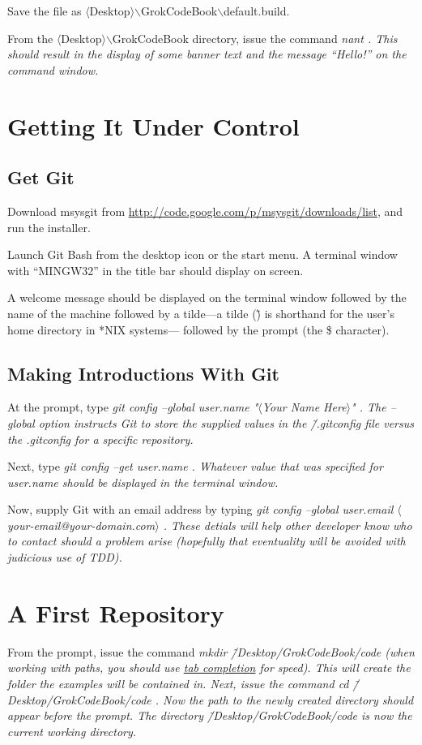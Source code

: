 Save the file as $\langle$Desktop$\rangle$$\backslash$GrokCodeBook$\backslash$default.build.

From the $\langle$Desktop$\rangle$$\backslash$GrokCodeBook directory, issue the command \em nant \em. This should result in the display of some banner text and the message ``Hello!'' on the command window.

\section{Getting It Under Control}
\subsection{Get Git}
Download msysgit from \url{http://code.google.com/p/msysgit/downloads/list}, and run the installer.

Launch Git Bash from the desktop icon or the start menu. A terminal window with ``MINGW32'' in the title bar should display on screen.

A welcome message should be displayed on the terminal window followed by the name of the machine followed by a tilde---a tilde (\~) is shorthand for the user's home directory in *NIX systems--- followed by the prompt (the \$ character).

\subsection{Making Introductions With Git}
At the prompt, type \em git config --global user.name "$\langle$Your Name Here$\rangle$" \em. The \em --global \em option instructs Git to store the supplied values in the \em \~/.gitconfig \em file versus the \em .gitconfig \em for a specific repository.

Next, type \em git config --get user.name \em. Whatever value that was specified for \em user.name \em should be displayed in the terminal window.

Now, supply Git with an email address by typing \em git config --global user.email $\langle$your-email@your-domain.com$\rangle$ \em. These detials will help other developer know who to contact should a problem arise (hopefully that eventuality will be avoided with judicious use of \gls{TDD}).

\section{A First Repository}
From the prompt, issue the command \em mkdir \~/Desktop/GrokCodeBook/code \em (when working with paths, you should use \hyperref[tab-completion]{tab completion} for speed). This will create the folder the examples will be contained in. Next, issue the command \em cd \~/Desktop/GrokCodeBook/code \em. Now the path to the newly created directory should appear before the prompt. The directory \em \~/Desktop/GrokCodeBook/code is now the current working directory.

